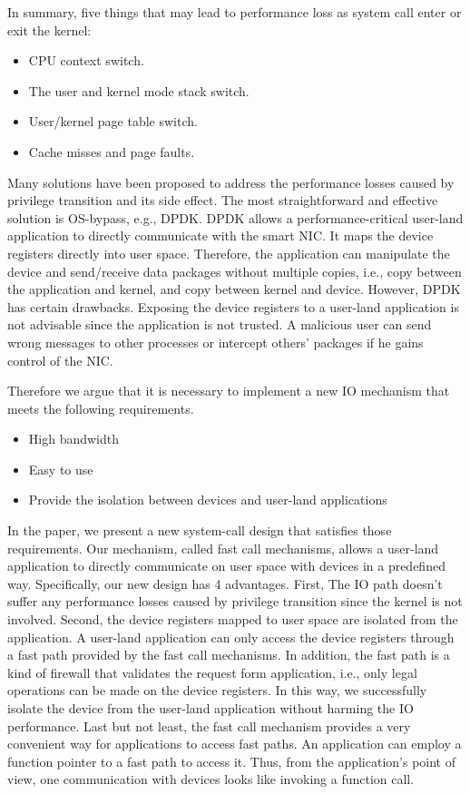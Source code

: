 In summary, five things that may lead to performance loss as system call 
enter or exit the kernel:
\begin{itemize}
  \item CPU context switch.
  \item The user and kernel mode stack switch.
  \item User/kernel page table switch.
  \item Cache misses and page faults.
\end{itemize}


Many solutions have been proposed to address the performance losses caused 
by privilege transition and its side effect. The most straightforward and 
effective solution is OS-bypass, e.g., DPDK\cite{7}. DPDK allows a performance-critical 
user-land application to directly communicate with the smart NIC. It maps the 
device registers directly into user space. Therefore, the application can manipulate
 the device and send/receive data packages without multiple copies, i.e., copy between the application and kernel, 
 and copy between kernel and device. However, DPDK has certain drawbacks. Exposing the device registers to a 
 user-land application is not advisable since the application is not trusted. A malicious user can send wrong 
 messages to other processes or intercept others' packages if he gains control of the NIC.


Therefore we argue that it is necessary to implement a new IO mechanism that meets the following requirements.

\begin{itemize}
  \item  High bandwidth
  \item  Easy to use
  \item  Provide the isolation between devices and user-land applications
\end{itemize}



 
In the paper, we present a new system-call design that satisfies those requirements. 
Our mechanism, called fast call mechanisms,  allows a user-land application to directly 
communicate on user space with devices in a predefined way. Specifically, our new design has 
4 advantages. First, The IO path doesn't suffer any performance losses caused by privilege 
transition since the kernel is not involved.  Second, the device registers mapped to user space 
are isolated from the application. A user-land application can only access the device registers 
through a fast path provided by the fast call mechanisms. In addition, the fast path is a kind
 of firewall that validates the request form application, i.e., only legal operations can be 
 made on the device registers. In this way, we successfully isolate the device from the user-land 
 application without harming the IO performance. Last but not least,  the fast call mechanism provides 
 a very convenient way for applications to access fast paths. An application can employ a function 
 pointer to a fast path to access it.  Thus, from the application's point of view,  one communication 
 with devices looks like invoking a function call.

